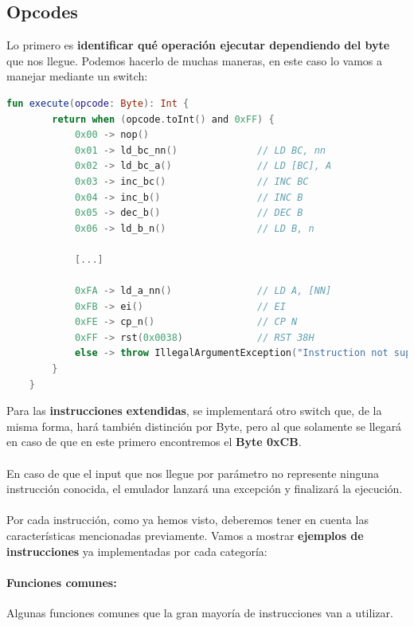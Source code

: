 \subsection{Opcodes}

Lo primero es \textbf{identificar qué operación ejecutar dependiendo del byte} que nos llegue. Podemos hacerlo de muchas maneras, en este caso lo vamos a manejar mediante un switch:

\begin{lstlisting}[language=Kotlin, caption={Identificación de Opcode}, label={code:kotlinwhen}]
    fun execute(opcode: Byte): Int {
        return when (opcode.toInt() and 0xFF) {
            0x00 -> nop()
            0x01 -> ld_bc_nn()              // LD BC, nn
            0x02 -> ld_bc_a()               // LD [BC], A
            0x03 -> inc_bc()                // INC BC
            0x04 -> inc_b()                 // INC B
            0x05 -> dec_b()                 // DEC B
            0x06 -> ld_b_n()                // LD B, n

            [...]

            0xFA -> ld_a_nn()               // LD A, [NN]
            0xFB -> ei()                    // EI
            0xFE -> cp_n()                  // CP N
            0xFF -> rst(0x0038)             // RST 38H
            else -> throw IllegalArgumentException("Instruction not supported: ${opcode.toInt() and 0xFF}")
        }
    }       
\end{lstlisting}

Para las \textbf{instrucciones extendidas}, se implementará otro switch que, de la misma forma, hará también distinción por Byte, pero al que solamente se llegará en caso de que en este primero encontremos el \textbf{Byte 0xCB}.
\\\\
En caso de que el input que nos llegue por parámetro no represente ninguna instrucción conocida, el emulador lanzará una excepción y finalizará la ejecución.
\\\\
Por cada instrucción, como ya hemos visto, deberemos tener en cuenta las características mencionadas previamente. Vamos a mostrar \textbf{ejemplos de instrucciones} ya implementadas por cada categoría:

\paragraph{Funciones comunes:}
Algunas funciones comunes que la gran mayoría de instrucciones van a utilizar.

